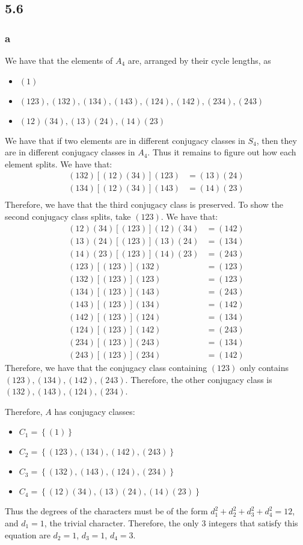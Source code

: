 \documentclass[]{article}
\begin{document}
\subsection*{5.6}
\subsubsection*{a}
We have that the elements of $A_4$ are, arranged by their cycle lengths, as
\begin{itemize}
	\item $(1)$
	\item $(123), (132), (134), (143), (124), (142), (234), (243)$
	\item $(12)(34), (13)(24), (14)(23)$
\end{itemize}
We have that if two elements are in different conjugacy classes in $S_4$, then they are in different conjugacy classes in $A_4$. Thus it remains to figure out how each element splits. We have that:
\begin{align*}
	(132) [(12)(34)](123) &= (13)(24)\\
	(134)[(12)(34)](143) &= (14)(23)\\
\end{align*}
Therefore, we have that the third conjugacy class is preserved. To show the second conjugacy class splits, take $(123)$. We have that:
\begin{align*}
	(12)(34) [(123)] (12)(34) &= (142)\\
	(13)(24) [(123)] (13)(24) &= (134)\\
	(14)(23) [(123)] (14)(23) &= (243)\\
	(123)[(123)](132) &= (123)\\
	(132)[(123)](123) &= (123)\\
	(134)[(123)](143) &= (243)\\
	(143) [(123)] (134) &= (142)\\
	(142)[(123)] (124) &= (134)\\
	(124)[(123)](142) &= (243)\\
	(234)[(123)](243) &= (134)\\
	(243)[(123)](234) &= (142)
\end{align*}
Therefore, we have that the conjugacy class containing $(123)$ only contains $(123), (134), (142), (243)$. Therefore, the other conjugacy class is $(132), (143), (124), (234)$. 

Therefore, $A$ has conjugacy classes:
\begin{itemize}
	\item $C_1 = \left\lbrace (1)\right\rbrace $
	\item $C_2 = \left\lbrace (123), (134), (142), (243)\right\rbrace $
	\item $C_3 = \left\lbrace (132), (143), (124), (234)\right\rbrace $
	\item $C_4 = \left\lbrace (12)(34), (13)(24), (14)(23)\right\rbrace $
\end{itemize}
Thus the degrees of the characters must be of the form $d_1^2 + d_2^2 + d_3^2 + d_4^2 = 12$, and $d_1 = 1$, the trivial character. Therefore, the only 3 integers that satisfy this equation are $d_2 = 1$, $d_3 = 1$, $d_4 = 3$. 
\end{document}
